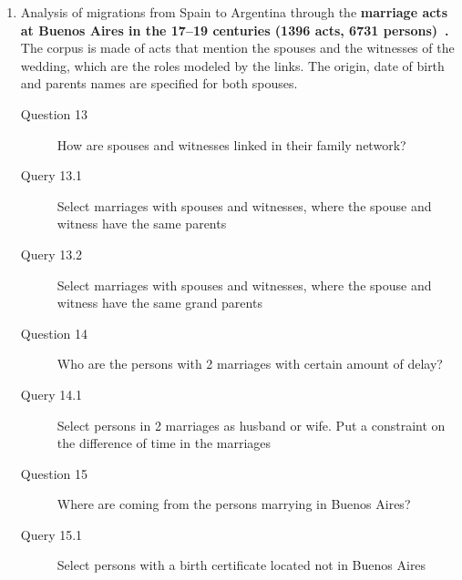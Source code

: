 \begin{enumerate}
    \item Analysis of migrations from Spain to Argentina through the \textbf{marriage acts at Buenos Aires in the 17--19 centuries (1396 acts, 6731 persons)~\cite{moutoukias2016buenos}.}
    The corpus is made of acts that mention the spouses and the witnesses of the wedding, which are the roles modeled by the links. The origin, date of birth and parents names are specified for both spouses.
    \begin{small}
        \begin{description}
            \item[Question 13] How are spouses and witnesses linked in their family network?
            \item[\myindent Query 13.1] Select marriages with spouses and witnesses, where the spouse and witness have the same parents
            \item[\myindent Query 13.2] Select marriages with spouses and witnesses, where the spouse and witness have the same grand parents
            \item[Question 14] Who are the persons with 2 marriages with certain amount of delay?
            \item[\myindent Query 14.1] Select persons in 2 marriages as husband or wife. Put a constraint on the difference of time in the marriages
            \item[Question 15] Where are coming from the persons marrying in Buenos Aires?
            \item[\myindent Query 15.1] Select persons with a birth certificate located not in Buenos Aires
        \end{description}
    \end{small}


\end{enumerate}
